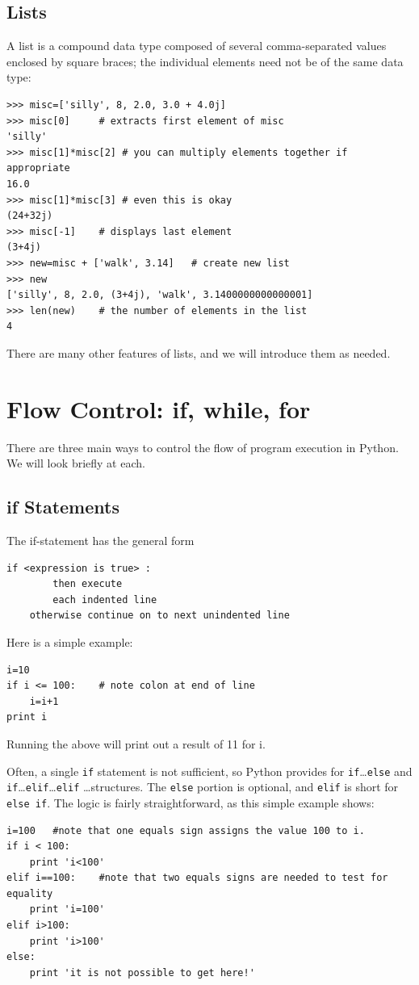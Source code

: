 \subsection{Lists}
\label{subsec-lists}
A list is a compound data type composed of several comma-separated values enclosed by square braces; the individual elements need not be of the same data type:
\begin{lstlisting}[frame=none]
>>> misc=['silly', 8, 2.0, 3.0 + 4.0j]
>>> misc[0]		# extracts first element of misc
'silly'
>>> misc[1]*misc[2]	# you can multiply elements together if appropriate
16.0
>>> misc[1]*misc[3]	# even this is okay
(24+32j)
>>> misc[-1]	# displays last element
(3+4j)
>>> new=misc + ['walk', 3.14]	# create new list 
>>> new
['silly', 8, 2.0, (3+4j), 'walk', 3.1400000000000001]
>>> len(new)	# the number of elements in the list
4
\end{lstlisting}
There are many other features of lists, and we will introduce them as needed.


\section{Flow Control: if, while, for}
\label{sec-flow}
There are three main ways to control the flow of program execution in Python. We will look briefly at each. 

\subsection{if Statements}
\label{subsec-if}
The if-statement has the general form 
\begin{lstlisting}[frame=none]
	if <expression is true> :
		then execute
		each indented line
	otherwise continue on to next unindented line
\end{lstlisting}
Here is a simple example:
\begin{lstlisting}[frame=none]
i=10
if i <= 100:	# note colon at end of line
	i=i+1
print i
\end{lstlisting}
Running the above will print out a result of 11 for i. 

Often, a single \verb!if! statement is not sufficient, so Python provides for \verb!if!\ldots \verb!else!
 and \verb!if!\ldots \verb!elif!\ldots \verb!elif! \ldots structures. The \verb!else! portion is optional, and \verb!elif! is short for \verb!else if!. The logic is fairly straightforward, as this simple example shows: 
\begin{lstlisting}[frame=none]
i=100	#note that one equals sign assigns the value 100 to i.
if i < 100:
	print 'i<100'
elif i==100:	#note that two equals signs are needed to test for equality
	print 'i=100'
elif i>100:
	print 'i>100'
else:
	print 'it is not possible to get here!'	
\end{lstlisting}

